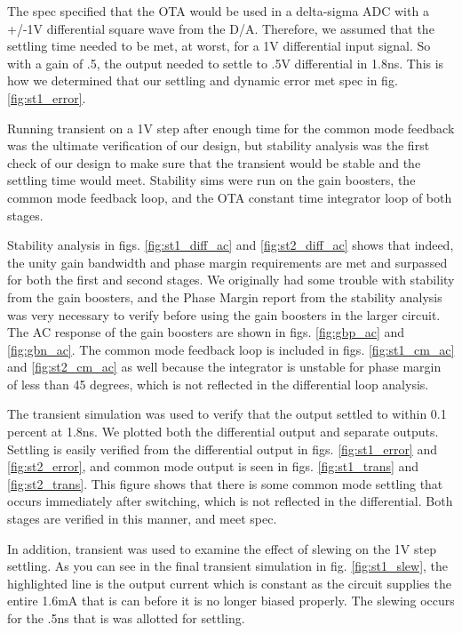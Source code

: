 \documentclass[conference]{IEEEtran}
\begin{document}
The spec specified that the OTA would be used in a delta-sigma ADC with a +/-1V differential square wave from the D/A. Therefore, we assumed that the settling time needed to be met, at worst, for a 1V differential input signal. So with a gain of .5, the output needed to settle to .5V differential in 1.8ns. This is how we determined that our settling and dynamic error met spec in fig. \ref{fig:st1_error}.

Running transient on a 1V step after enough time for the common mode feedback was the ultimate verification of our design, but stability analysis was the first check of our design to make sure that the transient would be stable and the settling time would meet. Stability sims were run on the gain boosters, the common mode feedback loop, and the OTA constant time integrator loop of both stages.

Stability analysis in figs. \ref{fig:st1_diff_ac} and \ref{fig:st2_diff_ac} shows that indeed, the unity gain bandwidth and phase margin requirements are met and surpassed for both the first and second stages. We originally had some trouble with stability from the gain boosters, and the Phase Margin report from the stability analysis was very necessary to verify before using the gain boosters in the larger circuit. The AC response of the gain boosters are shown in figs. \ref{fig:gbp_ac} and \ref{fig:gbn_ac}. The common mode feedback loop is included in figs. \ref{fig:st1_cm_ac} and \ref{fig:st2_cm_ac} as well because the integrator is unstable for phase margin of less than 45 degrees, which is not reflected in the differential loop analysis.



The transient simulation was used to verify that the output settled to within 0.1 percent at 1.8ns. We plotted both the differential output and separate outputs. Settling is easily verified from the differential output in figs. \ref{fig:st1_error} and \ref{fig:st2_error}, and common mode output is seen in figs. \ref{fig:st1_trans} and \ref{fig:st2_trans}. This figure shows that there is some common mode settling that occurs immediately after switching, which is not reflected in the differential. Both stages are verified in this manner, and meet spec.

In addition, transient was used to examine the effect of slewing on the 1V step settling. As you can see in the final transient simulation in fig. \ref{fig:st1_slew}, the highlighted line is the output current which is constant as the circuit supplies the entire 1.6mA that is can before it is no longer biased properly. The slewing occurs for the .5ns that is was allotted for settling.
\end{document}
